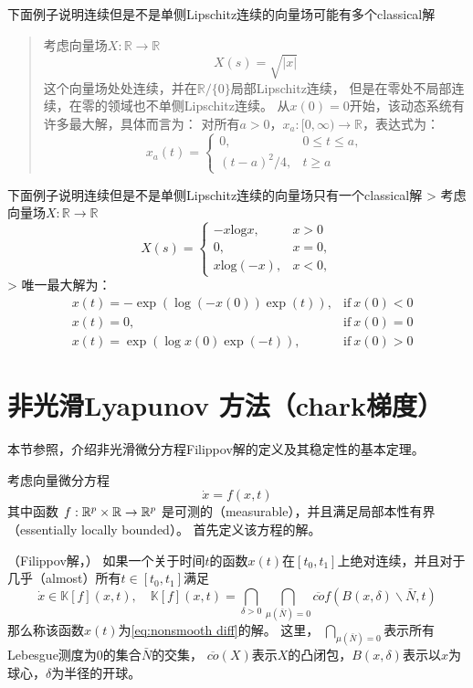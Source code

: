 下面例子说明连续但是不是单侧Lipschitz连续的向量场可能有多个classical解

\begin{quote}
考虑向量场\(X:\mathbb{R}\to\mathbb{R}\) \[
X(s)=\sqrt{|x|}
\] 这个向量场处处连续，并在\(\mathbb{R}/\{0\}\)局部Lipschitz连续，
但是在零处不局部连续，在零的领域也不单侧Lipschitz连续。
从\(x(0)=0\)开始，该动态系统有许多最大解，具体而言为：
对所有\(a>0\)，\(x_a:[0,\infty)\to \mathbb{R}\)，表达式为： \[
x_a(t)=\begin{cases}
0, & 0\leq t \leq a,\\
(t-a)^2/4, & t\geq a
\end{cases}
\]
\end{quote}

下面例子说明连续但是不是单侧Lipschitz连续的向量场只有一个classical解
\textgreater{} 考虑向量场\(X:\mathbb{R}\to\mathbb{R}\) \[
X(s)=\begin{cases}
-x \mathrm{log} x, & x>0\\
0,                            & x=0,\\
x \mathrm{log}(-x),& x<0,
\end{cases}
\] \textgreater{} 唯一最大解为： \[
\begin{aligned}
    &x(t)=-\exp(\log (-x(0)) \exp(t)), 
    &\textrm{if}\ x(0)<0 \\
    &x(t)=0, 
    &\textrm{if}\ x(0)=0 \\
    &x(t)=\exp(\log x(0) \exp(-t)), 
    &\textrm{if}\ x(0)>0
\end{aligned}
\]



\section{非光滑Lyapunov 方法（chark梯度）}


本节参照\parencite{shevitzLyapunovStabilityTheory1994,郑凯_基于Filippov微分包含解的非平滑控制系统}，介绍非光滑微分方程Filippov解的定义及其稳定性的基本定理。

考虑向量微分方程
\begin{equation}\label{eq:nonsmooth diff}
    \dot{x}=f(x,t)
\end{equation}
其中函数 $f:\mathbb{R}^p \times \mathbb{R} \to \mathbb{R}^p$ 是可测的（measurable），并且满足局部本性有界（essentially locally bounded）。
首先定义该方程的解。

\begin{definition}
    （Filippov解，\cite{filippovDifferentialEquationsDiscontinuous1988}）
    如果一个关于时间$t$的函数$x(t)$在$[t_0,t_1]$上绝对连续，并且对于几乎（almost）所有$t\in[t_0,t_1]$满足
    \[
        \dot{x}\in \mathbb{K}[f](x,t),
        \quad 
        \mathbb{K}[f](x,t)=\bigcap_{\delta>0} \bigcap_{\mu(\bar{N})=0} \overline{co} f(B(x,\delta)\backslash \bar{N},t)
    \]
    那么称该函数$x(t)$为\eqref{eq:nonsmooth diff}的解。
    这里，
    $\bigcap_{\mu(\bar{N})=0}$表示所有Lebesgue测度为0的集合$\bar{N}$的交集，
    $\overline{co}(X)$表示$X$的凸闭包，$B(x,\delta)$表示以$x$为球心，$\delta$为半径的开球。
\end{definition}


